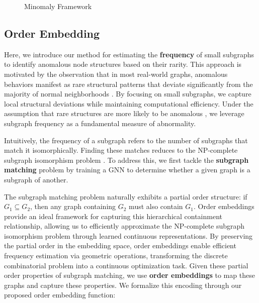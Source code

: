 \documentclass[pdflatex,sn-mathphys-num]{sn-jnl}%
\theoremstyle{thmstyleone}%
\theoremstyle{thmstyletwo}%
\theoremstyle{thmstylethree}%
\begin{document}
\begin{figure}[H]
    \centering
    \resizebox{0.96\linewidth}{!}{}
    \caption{Minomaly Framework}
    \label{fig:framework}
\end{figure}

\subsection{Order Embedding}

Here, we introduce our method for estimating the \textbf{frequency} of small subgraphs to identify anomalous node structures based on their rarity. This approach is motivated by the observation that in most real-world graphs, anomalous behaviors manifest as rare structural patterns that deviate significantly from the majority of normal neighborhoods \cite{akoglu2015graph}. By focusing on small subgraphs, we capture local structural deviations while maintaining computational efficiency. Under the assumption that rare structures are more likely to be anomalous \cite{Ruff_2021}, we leverage subgraph frequency as a fundamental measure of abnormality.

Intuitively, the frequency of a subgraph refers to the number of subgraphs that match it isomorphically. Finding these matches reduces to the NP-complete subgraph isomorphism problem \cite{cook2023complexity}. To address this, we first tackle the \textbf{subgraph matching} problem by training a GNN to determine whether a given graph is a subgraph of another.

The subgraph matching problem naturally exhibits a partial order structure: if $G_1 \subseteq G_2$, then any graph containing $G_2$ must also contain $G_1$. Order embeddings provide an ideal framework for capturing this hierarchical containment relationship, allowing us to efficiently approximate the NP-complete subgraph isomorphism problem through learned continuous representations. By preserving the partial order in the embedding space, order embeddings enable efficient frequency estimation via geometric operations, transforming the discrete combinatorial problem into a continuous optimization task. Given these partial order properties of subgraph matching, we use \textbf{order embeddings} to map these graphs and capture these properties. We formalize this encoding through our proposed order embedding function:
\end{document}
